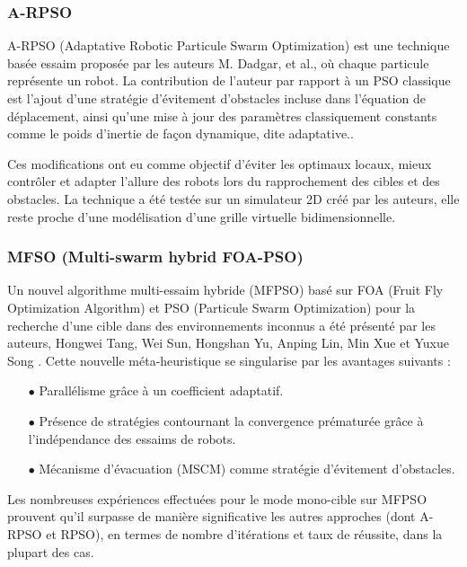 \subsubsection{A-RPSO}
A-RPSO (Adaptative Robotic Particule Swarm Optimization) est une technique basée essaim proposée par les auteurs M. Dadgar, et al., où chaque particule représente un robot. La contribution de l’auteur par rapport à un PSO classique est l’ajout d’une stratégie d’évitement d’obstacles incluse dans l’équation de déplacement, ainsi qu’une mise à jour des paramètres classiquement constants comme le poids d'inertie de façon dynamique,  dite adaptative.\cite{Dadgar2016}.



Ces modifications ont eu comme objectif d’éviter les optimaux locaux, mieux contrôler et adapter l’allure des robots lors du rapprochement des cibles et des obstacles. La technique a été testée sur un simulateur 2D créé par les auteurs, elle reste proche d’une modélisation d’une grille virtuelle bidimensionnelle.  


\subsubsection{MFSO (Multi-swarm hybrid FOA-PSO)}
Un nouvel algorithme multi-essaim hybride (MFPSO) basé sur FOA (Fruit Fly Optimization Algorithm) et PSO (Particule Swarm Optimization) pour la recherche d’une cible dans des environnements inconnus a été présenté par les auteurs, Hongwei Tang, Wei Sun, Hongshan Yu, Anping Lin, Min Xue et Yuxue Song \cite{novel}. Cette nouvelle méta-heuristique se singularise par les avantages suivants : \\

\begin{itemize}
	\item [$\bullet$] Parallélisme grâce à un coefficient adaptatif.
	
	\item[$\bullet$] Présence de stratégies contournant la convergence prématurée grâce à l'indépendance des essaims de robots.
	
	\item[$\bullet$] Mécanisme d'évacuation (MSCM) comme stratégie d'évitement d'obstacles.\\
\end{itemize}

Les nombreuses expériences effectuées pour le mode mono-cible sur MFPSO prouvent qu’il surpasse de manière significative les autres approches (dont A-RPSO et RPSO), en termes de nombre d’itérations et taux de réussite, dans la plupart des cas.
 
